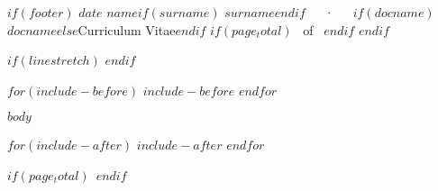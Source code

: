\documentclass[11pt, a4paper]{awesome-cv}
\begin{document}
\makecvheader

$if(footer)$
\makecvfooter
  {$date$}
    {$name$$if(surname)$ $surname$$endif$~~~·~~~$if(docname)$$docname$$else$Curriculum Vitae$endif$}
  {\thepage$if(page_total)$~ of \pageref{LastPage}~$endif$}
$endif$



$if(linestretch)$
$endif$

$for(include-before)$
$include-before$
$endfor$

$body$

$for(include-after)$
$include-after$
$endfor$

$if(page_total)$\label{LastPage}~$endif$
\end{document}
